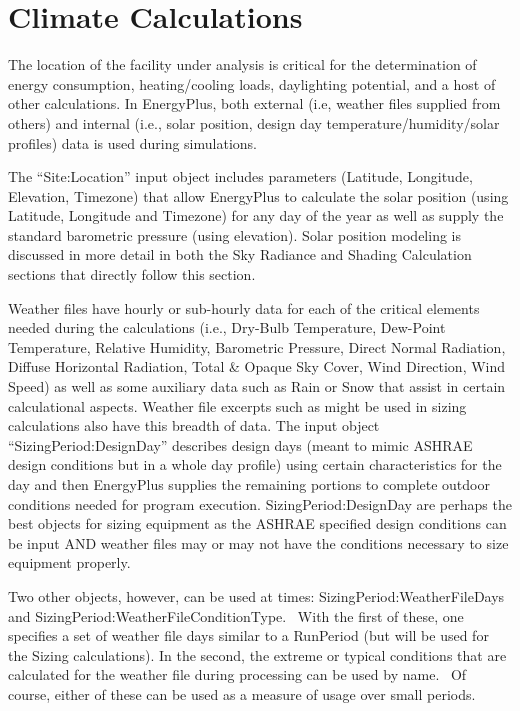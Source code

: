 \section{Climate Calculations}\label{climate-calculations}

The location of the facility under analysis is critical for the determination of energy consumption, heating/cooling loads, daylighting potential, and a host of other calculations. In EnergyPlus, both external (i.e, weather files supplied from others) and internal (i.e., solar position, design day temperature/humidity/solar profiles) data is used during simulations.

The ``Site:Location'' input object includes parameters (Latitude, Longitude, Elevation, Timezone) that allow EnergyPlus to calculate the solar position (using Latitude, Longitude and Timezone) for any day of the year as well as supply the standard barometric pressure (using elevation). Solar position modeling is discussed in more detail in both the Sky Radiance and Shading Calculation sections that directly follow this section.

Weather files have hourly or sub-hourly data for each of the critical elements needed during the calculations (i.e., Dry-Bulb Temperature, Dew-Point Temperature, Relative Humidity, Barometric Pressure, Direct Normal Radiation, Diffuse Horizontal Radiation, Total \& Opaque Sky Cover, Wind Direction, Wind Speed) as well as some auxiliary data such as Rain or Snow that assist in certain calculational aspects. Weather file excerpts such as might be used in sizing calculations also have this breadth of data. The input object ``SizingPeriod:DesignDay'' describes design days (meant to mimic ASHRAE design conditions but in a whole day profile) using certain characteristics for the day and then EnergyPlus supplies the remaining portions to complete outdoor conditions needed for program execution. SizingPeriod:DesignDay are perhaps the best objects for sizing equipment as the ASHRAE specified design conditions can be input AND weather files may or may not have the conditions necessary to size equipment properly.

Two other objects, however, can be used at times: SizingPeriod:WeatherFileDays and SizingPeriod:WeatherFileConditionType.~ With the first of these, one specifies a set of weather file days similar to a RunPeriod (but will be used for the Sizing calculations). In the second, the extreme or typical conditions that are calculated for the weather file during processing can be used by name.~ Of course, either of these can be used as a measure of usage over small periods.

